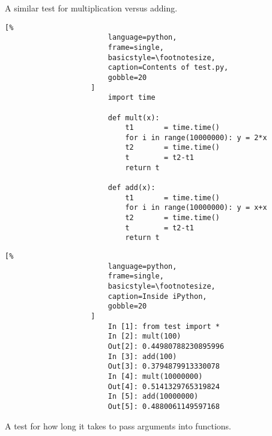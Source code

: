 \documentclass[crop=false,class=book,oneside]{standalone}
\begin{document}
                A similar test for multiplication versus adding.
                \newpage
                \begin{minipage}[t]{.48\textwidth}
                    \centering
                    \begin{lstlisting}[%
                        language=python,
                        frame=single,
                        basicstyle=\footnotesize,
                        caption=Contents of test.py,
                        gobble=20
                    ]
                        import time
                
                        def mult(x):
                            t1       = time.time()
                            for i in range(10000000): y = 2*x
                            t2       = time.time()
                            t        = t2-t1
                            return t
                        
                        def add(x):
                            t1       = time.time()
                            for i in range(10000000): y = x+x
                            t2       = time.time()
                            t        = t2-t1
                            return t
                    \end{lstlisting}
                \end{minipage}\hfill
                \begin{minipage}[t]{.48\textwidth}
                    \centering
                    \begin{lstlisting}[%
                        language=python,
                        frame=single,
                        basicstyle=\footnotesize,
                        caption=Inside iPython,
                        gobble=20
                    ]
                        In [1]: from test import *
                        In [2]: mult(100)
                        Out[2]: 0.44980788230895996
                        In [3]: add(100)
                        Out[3]: 0.3794879913330078
                        In [4]: mult(10000000)
                        Out[4]: 0.5141329765319824
                        In [5]: add(10000000)
                        Out[5]: 0.4880061149597168
                    \end{lstlisting}
                \end{minipage}\newline
                A test for how long it takes to pass arguments into
                functions.
                \newline
\end{document}
